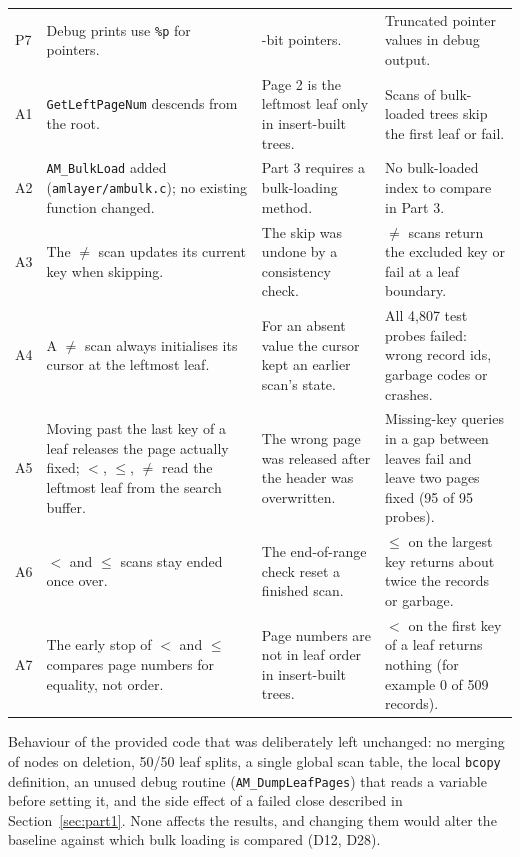 \documentclass[11pt,a4paper]{article}
\begin{document}
\begin{longtable}{>{\raggedright\arraybackslash}p{0.6cm}>{\raggedright\arraybackslash}p{4.3cm}>{\raggedright\arraybackslash}p{4.2cm}>{\raggedright\arraybackslash}p{5.2cm}}
P7 & Debug prints use \texttt{\%p} for pointers. & 64-bit pointers. & Truncated pointer values in debug output. \\
A1 & \texttt{GetLeftPageNum} descends from the root. & Page 2 is the leftmost leaf only in insert-built trees. & Scans of bulk-loaded trees skip the first leaf or fail. \\
A2 & \texttt{AM\_BulkLoad} added (\texttt{amlayer/ambulk.c}); no existing function changed. & Part 3 requires a bulk-loading method. & No bulk-loaded index to compare in Part 3. \\
A3 & The \(\ne\) scan updates its current key when skipping. & The skip was undone by a consistency check. & \(\ne\) scans return the excluded key or fail at a leaf boundary. \\
A4 & A \(\ne\) scan always initialises its cursor at the leftmost leaf. & For an absent value the cursor kept an earlier scan's state. & All 4{,}807 test probes failed: wrong record ids, garbage codes or crashes. \\
A5 & Moving past the last key of a leaf releases the page actually fixed; \(<\), \(\le\), \(\ne\) read the leftmost leaf from the search buffer. & The wrong page was released after the header was overwritten. & Missing-key queries in a gap between leaves fail and leave two pages fixed (95 of 95 probes). \\
A6 & \(<\) and \(\le\) scans stay ended once over. & The end-of-range check reset a finished scan. & \(\le\) on the largest key returns about twice the records or garbage. \\
A7 & The early stop of \(<\) and \(\le\) compares page numbers for equality, not order. & Page numbers are not in leaf order in insert-built trees. & \(<\) on the first key of a leaf returns nothing (for example 0 of 509 records). \\
\bottomrule
\end{longtable}
\normalsize

Behaviour of the provided code that was deliberately left unchanged: no merging of nodes on deletion, 50/50 leaf splits, a single global scan table, the local \texttt{bcopy} definition, an unused debug routine (\texttt{AM\_DumpLeafPages}) that reads a variable before setting it, and the side effect of a failed close described in Section~\ref{sec:part1}. None affects the results, and changing them would alter the baseline against which bulk loading is compared (D12, D28).

\end{document}
